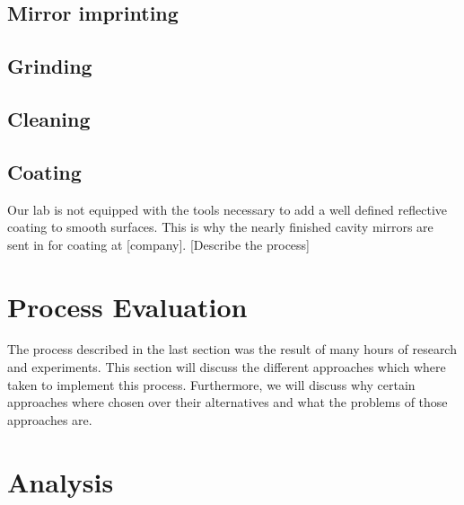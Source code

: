 \subsection{Mirror imprinting}
\subsection{Grinding}
\subsection{Cleaning}
\subsection{Coating}
Our lab is not equipped with the tools necessary to add a well defined reflective coating to smooth surfaces. This is why the nearly finished cavity mirrors are sent in for coating at [company]. [Describe the process]

\section{Process Evaluation}
The process described in the last section was the result of many hours of research and experiments. This section will discuss the different approaches which where taken to implement this process. Furthermore, we will discuss why certain approaches where chosen over their alternatives and what the problems of those approaches are.
\section{Analysis}